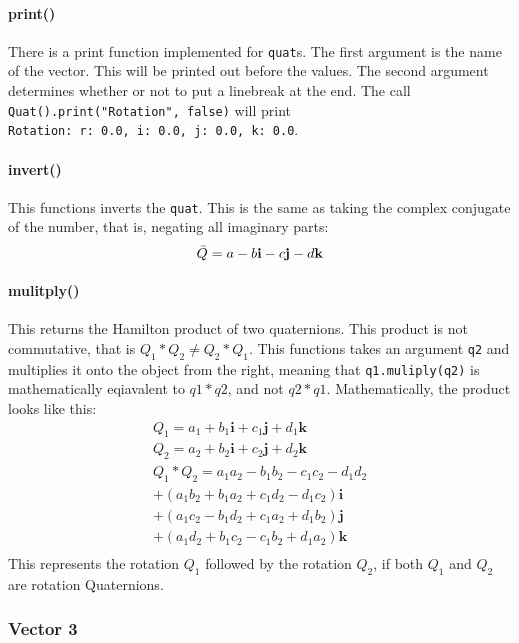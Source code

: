 \documentclass{article}
\begin{document}
\paragraph*{print()}
There is a print function implemented for \verb|quat|s. The first argument is the name of the vector. This will be printed out before the values. The second argument determines
whether or not to put a linebreak at the end. The call \verb|Quat().print("Rotation", false)| will print\\
\verb|Rotation: r: 0.0, i: 0.0, j: 0.0, k: 0.0|.

\paragraph*{invert()}
This functions inverts the \verb|quat|. This is the same as taking the complex conjugate of the number, that is, negating all imaginary parts:
\begin{equation}
	\Bar{Q} = a - b\mathbf{i} - c\mathbf{j} - d\mathbf{k}
\end{equation}

\paragraph*{mulitply()}
This returns the Hamilton product of two quaternions. This product is not commutative, that is $Q_1*Q_2 \neq Q_2*Q_1$. This functions takes an argument \verb|q2| and multiplies
it onto the object from the right, meaning that \verb|q1.muliply(q2)| is mathematically eqiavalent to $q1*q2$, and not $q2*q1$. Mathematically, the product looks like this:
\begin{eqnarray*}
	Q_1 = a_1 + b_1\mathbf{i} + c_1\mathbf{j} + d_1\mathbf{k}\\
	Q_2 = a_2 + b_2\mathbf{i} + c_2\mathbf{j} + d_2\mathbf{k}\\
	Q_1*Q_2 = a_1a_2 -b_1b_2 - c_1c_2 - d_1d_2\\
			+ (a_1b_2 + b_1a_2 + c_1d_2 - d_1c_2)\mathbf{i}\\
			+ (a_1c_2 - b_1d_2 + c_1a_2 + d_1b_2)\mathbf{j}\\
			+ (a_1d_2 + b_1c_2 - c_1b_2 + d_1a_2)\mathbf{k}\\
\end{eqnarray*}
This represents the rotation $Q_1$ followed by the rotation $Q_2$, if both $Q_1$ and $Q_2$ are rotation Quaternions.

\subsubsection*{Vector 3}
\end{document}
